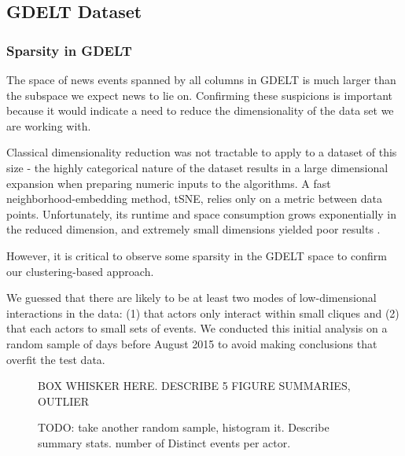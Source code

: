 
\subsection{GDELT Dataset}

\subsubsection{Sparsity in GDELT}

The space of news events spanned by all columns in GDELT is much larger than the subspace we expect news to lie on. Confirming these suspicions is important because it would indicate a need to reduce the dimensionality of the data set we are working with.

Classical dimensionality reduction was not tractable to apply to a dataset of this size - the highly categorical nature of the dataset results in a large dimensional expansion when preparing numeric inputs to the algorithms. A fast neighborhood-embedding method, tSNE, relies only on a metric between data points. Unfortunately, its runtime and space consumption grows exponentially in the reduced dimension, and extremely small dimensions yielded poor results .

However, it is critical to observe some sparsity in the GDELT space to confirm our clustering-based approach.

We guessed that there are likely to be at least two modes of low-dimensional interactions in the data: (1) that actors only interact within small cliques and (2) that each actors to small sets of events. We conducted this initial analysis on a random sample of days before August 2015 to avoid making conclusions that overfit the test data.

\begin{figure}[ht]
\vskip 0.2in
\begin{center}
\caption{
BOX WHISKER HERE. DESCRIBE 5 FIGURE SUMMARIES, OUTLIER
}
\end{center}
\vskip -0.2in
\label{fig:events-per-actor}
\end{figure} 


\begin{figure}[ht]
\vskip 0.2in
\begin{center}
\caption{TODO: take another random sample, histogram it. Describe summary stats. number of Distinct events per actor.}
\end{center}
\vskip -0.2in
\label{fig:events-per-actor}
\end{figure} 


